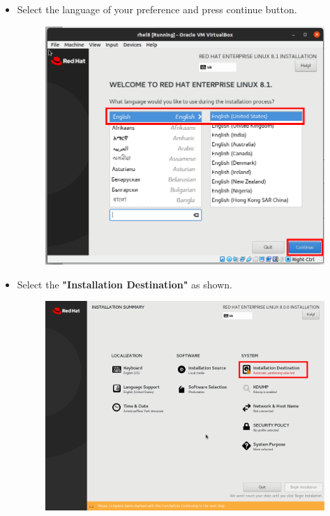 \begin{flushleft}
\begin{itemize}
	\item Select the language of your preference and press continue button.
 	\begin{figure}[h!]
		\centering
		\includegraphics[scale=.2]{content/chapter18/images/image1.1.png}
	\end{figure}		

	\newpage
	
 	\item Select the \textbf{"Installation Destination"} as shown.
	\begin{figure}[h!]
		\centering
		\includegraphics[scale=.2]{content/chapter18/images/image12.png}
	\end{figure}		


\end{itemize}
\end{flushleft}
